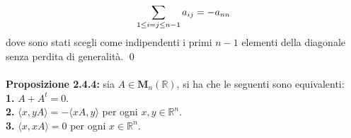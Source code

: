 \documentclass{article}
\begin{document}
\begin{gather}
    \sum_{1 \leq i = j \leq n - 1} a_{ij} = - a_{nn} \notag
\end{gather}
dove sono stati scegli come indipendenti i primi $n - 1$ elementi della diagonale senza perdita di generalità. \qed \\ \\
\textbf{Proposizione 2.4.4:} sia $A \in \mathbf{M}_n(\mathbb{R})$, si ha che le seguenti sono equivalenti: \\
\textbf{1.} $A + A^t = 0$. \\
\textbf{2.} $\langle x, yA \rangle = -\langle xA, y \rangle$ per ogni $x, y \in \mathbb{R}^n$. \\
\textbf{3.} $\langle x, xA \rangle = 0$ per ogni $x \in \mathbb{R}^n$. \\
\end{document}
